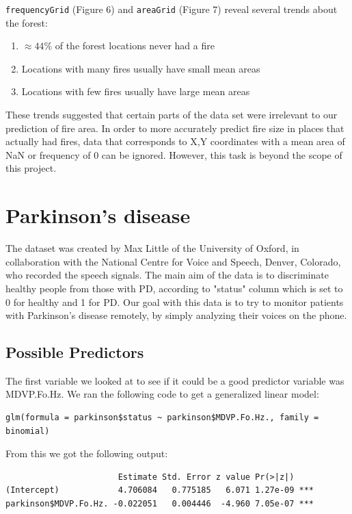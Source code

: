 \documentclass{article}
\begin{document}
\verb+frequencyGrid+ (Figure 6) and \verb+areaGrid+ (Figure 7) reveal several
trends about the forest:

\begin{enumerate}
	\item $\approx 44\%$ of the forest locations never had a fire
	\item Locations with many fires usually have small mean areas
	\item Locations with few fires usually have large mean areas
\end{enumerate}

These trends suggested that certain parts of the data set were
irrelevant to our prediction of fire area. In order to more accurately
predict fire size in places that actually had fires, data that corresponds
to X,Y coordinates with a mean area of NaN or frequency of 0 can be ignored.
However, this task is beyond the scope of this project.

\section{Parkinson's disease}

The dataset was created by Max Little of the University of Oxford, in
collaboration with the National Centre for Voice and Speech, Denver, Colorado,
who recorded the speech signals. The main aim of the data is to discriminate healthy
people from those with PD, according to "status" column which is set to 0 for
healthy and 1 for PD. Our goal with this data is to try to monitor patients with
Parkinson's disease remotely, by simply analyzing their voices on the phone.

\subsection{Possible Predictors}
The first variable we looked at to see if it could be a good predictor variable was
MDVP.Fo.Hz. We ran the following code to get a generalized linear model:

\begin{verbatim}
glm(formula = parkinson$status ~ parkinson$MDVP.Fo.Hz., family = binomial)
\end{verbatim}

From this we got the following output:

\begin{verbatim}
                       Estimate Std. Error z value Pr(>|z|)    
(Intercept)            4.706084   0.775185   6.071 1.27e-09 ***
parkinson$MDVP.Fo.Hz. -0.022051   0.004446  -4.960 7.05e-07 ***
\end{verbatim}
\end{document}
